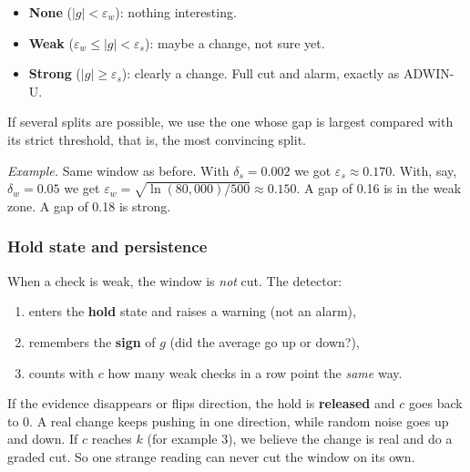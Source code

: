 \documentclass[11pt,a4paper]{article}
\begin{document}
\begin{center}
\end{center}

\begin{itemize}
\item \textbf{None} ($|g|<\varepsilon_w$): nothing interesting.
\item \textbf{Weak} ($\varepsilon_w\le|g|<\varepsilon_s$): maybe a change, not sure yet.
\item \textbf{Strong} ($|g|\ge\varepsilon_s$): clearly a change. Full cut and alarm, exactly as ADWIN-U.
\end{itemize}
If several splits are possible, we use the one whose gap is largest compared with its strict threshold, that is, the most convincing split.

\emph{Example.} Same window as before. With $\delta_s=0.002$ we got $\varepsilon_s\approx0.170$. With, say, $\delta_w=0.05$ we get $\varepsilon_w=\sqrt{\ln(80{,}000)/500}\approx0.150$. A gap of 0.16 is in the weak zone. A gap of 0.18 is strong.

\subsubsection*{Hold state and persistence}
When a check is weak, the window is \emph{not} cut. The detector:
\begin{enumerate}
\item enters the \textbf{hold} state and raises a warning (not an alarm),
\item remembers the \textbf{sign} of $g$ (did the average go up or down?),
\item counts with $c$ how many weak checks in a row point the \emph{same} way.
\end{enumerate}
If the evidence disappears or flips direction, the hold is \textbf{released} and $c$ goes back to 0. A real change keeps pushing in one direction, while random noise goes up and down. If $c$ reaches $k$ (for example 3), we believe the change is real and do a graded cut. So one strange reading can never cut the window on its own.
\end{document}

